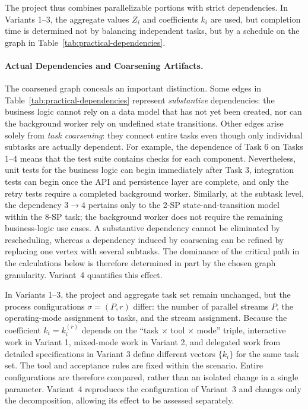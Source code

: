 The project thus combines parallelizable portions with strict dependencies. In
Variants 1--3, the aggregate values $Z_i$ and coefficients $k_i$ are used, but
completion time is determined not by balancing independent tasks, but by a
schedule on the graph in Table~\ref{tab:practical-dependencies}.

\paragraph{Actual Dependencies and Coarsening Artifacts.}
The coarsened graph conceals an important distinction. Some edges in
Table~\ref{tab:practical-dependencies} represent \emph{substantive}
dependencies: the business logic cannot rely on a data model that has not yet
been created, nor can the background worker rely on undefined state
transitions. Other edges arise solely from \emph{task coarsening}: they connect
entire tasks even though only individual subtasks are actually dependent. For
example, the dependence of Task 6 on Tasks 1--4 means that the test suite
contains checks for each component. Nevertheless, unit tests for the business
logic can begin immediately after Task 3, integration tests can begin once the
API and persistence layer are complete, and only the retry tests require a
completed background worker. Similarly, at the subtask level, the dependency
$3 \to 4$ pertains only to the 2-SP state-and-transition model within the 8-SP
task; the background worker does not require the remaining business-logic use
cases. A substantive dependency cannot be eliminated by rescheduling, whereas
a dependency induced by coarsening can be refined by replacing one vertex with
several subtasks. The dominance of the critical path in the calculations below
is therefore determined in part by the chosen graph granularity. Variant~4
quantifies this effect.

In Variants 1--3, the project and aggregate task set remain unchanged, but the
process configurations $\sigma = (P, r)$ differ: the number of parallel streams
$P$, the operating-mode assignment to tasks, and the stream assignment. Because the
coefficient $k_i = k_i^{(r)}$ depends on the ``task $\times$ tool $\times$
mode'' triple, interactive work in Variant 1, mixed-mode work in Variant 2, and
delegated work from detailed specifications in Variant 3 define different
vectors $\{k_i\}$ for the same task set. The tool and acceptance rules are fixed
within the scenario. Entire configurations are therefore compared, rather than
an isolated change in a single parameter. Variant~4 reproduces the
configuration of Variant~3 and changes only the decomposition, allowing its
effect to be assessed separately.

